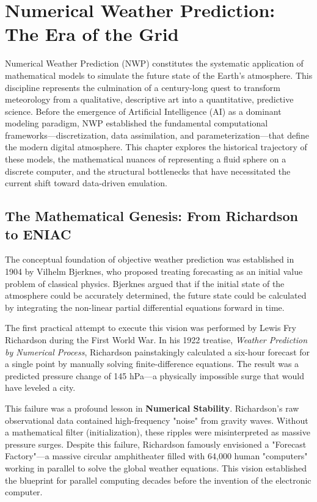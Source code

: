 \chapter{Numerical Weather Prediction: The Era of the Grid}

Numerical Weather Prediction (NWP) constitutes the systematic application of mathematical models to simulate the future state of the Earth’s atmosphere. This discipline represents the culmination of a century-long quest to transform meteorology from a qualitative, descriptive art into a quantitative, predictive science. Before the emergence of Artificial Intelligence (AI) as a dominant modeling paradigm, NWP established the fundamental computational frameworks—discretization, data assimilation, and parameterization—that define the modern digital atmosphere. This chapter explores the historical trajectory of these models, the mathematical nuances of representing a fluid sphere on a discrete computer, and the structural bottlenecks that have necessitated the current shift toward data-driven emulation.

\section{The Mathematical Genesis: From Richardson to ENIAC}

The conceptual foundation of objective weather prediction was established in 1904 by Vilhelm Bjerknes, who proposed treating forecasting as an initial value problem of classical physics. Bjerknes argued that if the initial state of the atmosphere could be accurately determined, the future state could be calculated by integrating the non-linear partial differential equations forward in time.

The first practical attempt to execute this vision was performed by Lewis Fry Richardson during the First World War. In his 1922 treatise, \textit{Weather Prediction by Numerical Process}, Richardson painstakingly calculated a six-hour forecast for a single point by manually solving finite-difference equations. The result was a predicted pressure change of 145 hPa—a physically impossible surge that would have leveled a city. 

This failure was a profound lesson in \textbf{Numerical Stability}. Richardson’s raw observational data contained high-frequency "noise" from gravity waves. Without a mathematical filter (initialization), these ripples were misinterpreted as massive pressure surges. Despite this failure, Richardson famously envisioned a "Forecast Factory"—a massive circular amphitheater filled with 64,000 human "computers" working in parallel to solve the global weather equations. This vision established the blueprint for parallel computing decades before the invention of the electronic computer.

